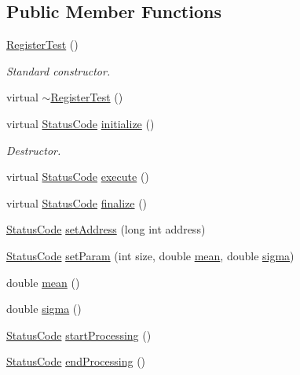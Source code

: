 \subsection*{Public Member Functions}
\begin{DoxyCompactItemize}
\item 
\hyperlink{classRegisterTest_a0c77058c104d6249d884d864a4f61524}{Register\+Test} ()
\begin{DoxyCompactList}\small\item\em Standard constructor. \end{DoxyCompactList}\item 
virtual \hyperlink{classRegisterTest_aa52cee0f106fabf76ee320c391ec94a2}{$\sim$\+Register\+Test} ()
\item 
virtual \hyperlink{classStatusCode}{Status\+Code} \hyperlink{classRegisterTest_a77354dcd379c33deae6b713a1ba697b5}{initialize} ()
\begin{DoxyCompactList}\small\item\em Destructor. \end{DoxyCompactList}\item 
virtual \hyperlink{classStatusCode}{Status\+Code} \hyperlink{classRegisterTest_aa1a19b0cd0e0f2d8a47913521ae259a4}{execute} ()
\item 
virtual \hyperlink{classStatusCode}{Status\+Code} \hyperlink{classRegisterTest_a6d37b30d3e663c99f7deef01310bea76}{finalize} ()
\item 
\hyperlink{classStatusCode}{Status\+Code} \hyperlink{classRegisterTest_a5ed3012183069fb4c76580efcf4cec3a}{set\+Address} (long int address)
\item 
\hyperlink{classStatusCode}{Status\+Code} \hyperlink{classRegisterTest_ac2c7c3721a238161d300bf1df5ffb1a5}{set\+Param} (int size, double \hyperlink{classRegisterTest_a5d3726a88a7fdcd90981bb5de8399df9}{mean}, double \hyperlink{classRegisterTest_af2a1f9ac2798188e52198fc264ae55cc}{sigma})
\item 
double \hyperlink{classRegisterTest_a5d3726a88a7fdcd90981bb5de8399df9}{mean} ()
\item 
double \hyperlink{classRegisterTest_af2a1f9ac2798188e52198fc264ae55cc}{sigma} ()
\item 
\hyperlink{classStatusCode}{Status\+Code} \hyperlink{classProcessus_a09319bde9bed93e290f69b4e04585543}{start\+Processing} ()
\item 
\hyperlink{classStatusCode}{Status\+Code} \hyperlink{classProcessus_a5e4da662989d356b89d490b89c7afbfd}{end\+Processing} ()
\item 

\end{DoxyCompactItemize}
